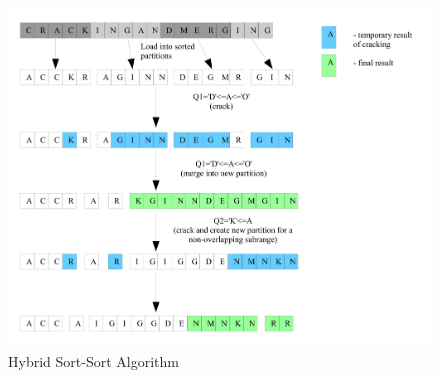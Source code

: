 \documentclass[10pt, conference, compsocconf]{IEEEtran}
\begin{document}
\begin{figure}[h]
\centering
\includegraphics[width=\columnwidth]{hsc.png}
\caption{Hybrid Sort-Sort Algorithm}
\end{figure}
\end{document}
